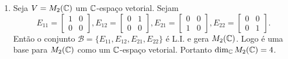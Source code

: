 \documentclass{beamer}
\begin{document}
\begin{frame}
    \begin{exemplos}
        \begin{enumerate}[label={\roman*})]
            \conti
            \item Seja $V = M_2(\mathbb{C})$ \pause um $\mathbb{C}$-espaço vetorial. \pause Sejam
            \[
            E_{11} = \begin{bmatrix}1 & 0\\0 & 0\end{bmatrix},
            E_{12} = \begin{bmatrix}0 & 1\\0 & 0\end{bmatrix},
            E_{21} = \begin{bmatrix}0 & 0\\1 & 0\end{bmatrix},
            E_{22} = \begin{bmatrix}0 & 0\\0 & 1\end{bmatrix}.
            \]\pause
            Então o conjunto $\mathcal{B} = \{E_{11}, E_{12}, E_{21}, E_{22}\}$ \pause é L.I. e gera $M_2(\mathbb{C})$. \pause Logo é uma base para $M_2(\mathbb{C})$ \pause como um $\mathbb{C}$-espaço vetorial. \pause Portanto $\dim_{\mathbb{C}} M_2(\mathbb{C}) = 4$.

            \seti
        \end{enumerate}
    \end{exemplos}
\end{frame}
\end{document}
